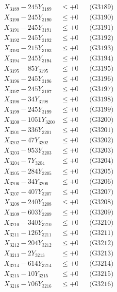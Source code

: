 \documentclass[a4paper,10pt]{article}
\begin{document}
{\begin{align}
X_{3189} - 245Y_{3189} &\leq +0 && \text{(G3189)} \\
X_{3190} - 245Y_{3190} &\leq +0 && \text{(G3190)} \\
\allowbreak
X_{3191} - 245Y_{3191} &\leq +0 && \text{(G3191)} \\
X_{3192} - 245Y_{3192} &\leq +0 && \text{(G3192)} \\
X_{3193} - 215Y_{3193} &\leq +0 && \text{(G3193)} \\
X_{3194} - 245Y_{3194} &\leq +0 && \text{(G3194)} \\
X_{3195} - 85Y_{3195} &\leq +0 && \text{(G3195)} \\
X_{3196} - 245Y_{3196} &\leq +0 && \text{(G3196)} \\
X_{3197} - 245Y_{3197} &\leq +0 && \text{(G3197)} \\
X_{3198} - 34Y_{3198} &\leq +0 && \text{(G3198)} \\
X_{3199} - 245Y_{3199} &\leq +0 && \text{(G3199)} \\
X_{3200} - 1051Y_{3200} &\leq +0 && \text{(G3200)} \\
\allowbreak
X_{3201} - 336Y_{3201} &\leq +0 && \text{(G3201)} \\
X_{3202} - 47Y_{3202} &\leq +0 && \text{(G3202)} \\
X_{3203} - 953Y_{3203} &\leq +0 && \text{(G3203)} \\
X_{3204} - 7Y_{3204} &\leq +0 && \text{(G3204)} \\
X_{3205} - 284Y_{3205} &\leq +0 && \text{(G3205)} \\
X_{3206} - 34Y_{3206} &\leq +0 && \text{(G3206)} \\
X_{3207} - 407Y_{3207} &\leq +0 && \text{(G3207)} \\
X_{3208} - 240Y_{3208} &\leq +0 && \text{(G3208)} \\
X_{3209} - 603Y_{3209} &\leq +0 && \text{(G3209)} \\
X_{3210} - 340Y_{3210} &\leq +0 && \text{(G3210)} \\
\allowbreak
X_{3211} - 126Y_{3211} &\leq +0 && \text{(G3211)} \\
X_{3212} - 204Y_{3212} &\leq +0 && \text{(G3212)} \\
X_{3213} - 2Y_{3213} &\leq +0 && \text{(G3213)} \\
X_{3214} - 614Y_{3214} &\leq +0 && \text{(G3214)} \\
X_{3215} - 10Y_{3215} &\leq +0 && \text{(G3215)} \\
X_{3216} - 706Y_{3216} &\leq +0 && \text{(G3216)} \\

\end{align}}
\end{document}
